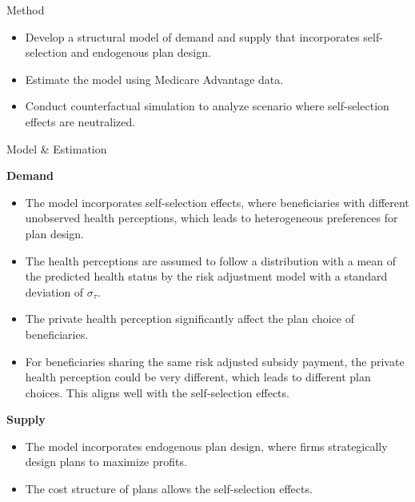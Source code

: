 \documentclass{beamer}
\begin{document}
\begin{frame}[t]
\begin{columns}[t]
\begin{column}{.3\textwidth}
      \begin{block}{Method}
        \begin{itemize}
          \item Develop a structural model of demand and supply that incorporates self-selection and endogenous plan design.
          \item Estimate the model using Medicare Advantage data.
          \item Conduct counterfactual simulation to analyze scenario where self-selection effects are neutralized.
        \end{itemize}
      \end{block}

      \begin{block}{Model \& Estimation}
      \begin{center}
      \textbf{Demand}
      \begin{itemize}
        \item The model incorporates self-selection effects, where beneficiaries with different unobserved health perceptions, which leads to heterogeneous preferences for plan design.
        \item The health perceptions are assumed to follow a distribution with a mean of the predicted health status by the risk adjustment model with a standard deviation of $\sigma_{\tau}$.
      \end{itemize}
      \end{center}
      
      \begin{itemize}
        \item The private health perception significantly affect the plan choice of beneficiaries.
        \item For beneficiaries sharing the same risk adjusted subsidy payment, the private health perception could be very different, which leads to different plan choices. This aligns well with the self-selection effects.
      \end{itemize}
    
    \begin{center}
      \textbf{Supply}
    \end{center}

    \begin{itemize}
      \item The model incorporates endogenous plan design, where firms strategically design plans to maximize profits.
      \item The cost structure of plans allows the self-selection effects.
    \end{itemize}
    

\end{block}
\end{column}
\end{columns}
\end{frame}
\end{document}
